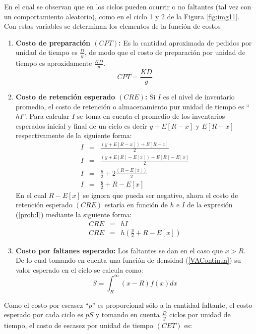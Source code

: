 En el cual se observan que en los ciclos pueden ocurrir o no faltantes (tal vez con un comportamiento aleatorio), como en el ciclo 1 y 2 de la Figura \ref{fig:img11}. Con estas variables se determinan los elementos de la función de costos
\begin{enumerate}
	\item \textbf{Costo de preparación $(CPT)$:} Es la cantidad aproximada de pedidos por unidad de tiempo es $\frac{D}{y}$, de modo que el costo de preparación por unidad de tiempo es aproxidamente $\frac{KD}{y}$.
	\begin{equation}
		\label{prob:CPT}
		CPT = \frac{KD}{y}
	\end{equation}
	\item \textbf{Costo de retención esperado $(CRE)$:} Si $I$ es el nivel de inventario promedio, el costo de retención o almacenamiento pur unidad de tiempo es ``$hI$''. Para calcular $I$ se toma en cuenta el promedio de los inventarios esperados inicial y final de un ciclo es decir $y + E[R - x]$ y $E[R-x]$ respectivamente de la siguiente forma:
	\begin{eqnarray}
		\label{prob:I}
		I &=& \frac{(y + E[R-x])+E[R-x]}{2} \nonumber \\
		I &=& \frac{(y+E[R]-E[x])+E[R]-E[x]}{2} \nonumber \\
		I &=& \frac{y}{2} + 2\frac{(R-E[x])}{2} \nonumber \\
		I &=& \frac{y}{2} + R - E[x]
	\end{eqnarray}
	En el cual $R-E[x]$ se ignora que pueda ser negativo, ahora el costo de retención esperado $(CRE)$ estaría en función de $h$ e $I$ de la expresión (\ref{prob:I}) mediante la siguiente forma:
	\begin{eqnarray}
		\label{prob:CRE}
		CRE &=& hI \nonumber \\
		CRE &=& h \left( \frac{y}{2} + R - E[x] \right)
	\end{eqnarray}
	\item \textbf{Costo por faltanes esperado:} Los faltantes se dan en el caso que $x > R$. De lo cual tomando en cuenta una función de densidad (\ref{VAContinua}) su valor esperado en el ciclo se calcula como:
	\begin{equation}
		\label{prob:S}
		S = \int_{R}^{\infty} (x-R)f(x)dx
	\end{equation}
\end{enumerate}
Como el costo por escasez ``$p$'' es proporcional sólo a la cantidad faltante, el costo esperado por cada ciclo es $pS$ y tomando en cuenta $\frac{D}{y}$ ciclos por unidad de tiempo, el costo de escasez por unidad de tiempo $(CET)$ es:
